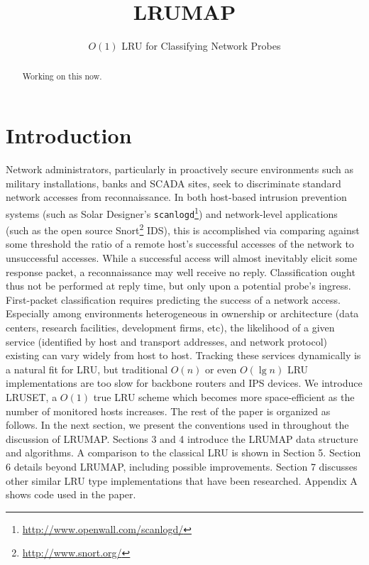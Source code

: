 \documentclass[10pt]{sigplanconf}
\begin{document}

\title{LRUMAP}
\subtitle{$O(1)$ LRU for Classifying Network Probes}

\maketitle
\begin{abstract}
Working on this now.
\end{abstract}




\section{Introduction}
Network administrators, particularly in proactively secure environments such
as military installations, banks and SCADA sites, seek to discriminate standard
network accesses from reconnaissance. In both host-based intrusion prevention
systems (such as Solar Designer's \texttt{scanlogd}\footnote{\url{http://www.openwall.com/scanlogd/}})
and network-level applications (such as the open source Snort\footnote{\url{http://www.snort.org/}} IDS),
this is accomplished via comparing against some threshold the ratio of a remote
host's successful accesses of the network to unsuccessful accesses. While a
successful access will almost inevitably elicit some response packet, a
reconnaissance may well receive no reply. Classification ought thus not be performed
at reply time, but only upon a potential probe's ingress.
First-packet classification requires predicting the success of a network access.
Especially among environments heterogeneous in ownership or architecture (data centers, research facilities,
development firms, etc), the likelihood of a given service (identified by host
and transport addresses, and network protocol) existing can vary widely from
host to host. Tracking these services dynamically is a natural fit for LRU, but
traditional $O(n)$ or even $O(\lg{n})$ LRU implementations are too slow for
backbone routers and IPS devices. We introduce LRUSET, a $O(1)$ true LRU scheme
which becomes more space-efficient as the number of monitored hosts increases.
The rest of the paper is organized as follows. In the next section, we present the conventions used in throughout the discussion of LRUMAP. Sections 3 and 4 introduce the LRUMAP data structure and algorithms. A comparison to the classical LRU is shown in Section 5. Section 6 details beyond LRUMAP, including possible improvements. Section 7 discusses other similar LRU type implementations that have been researched. Appendix A shows code used in the paper.
\end{document}
